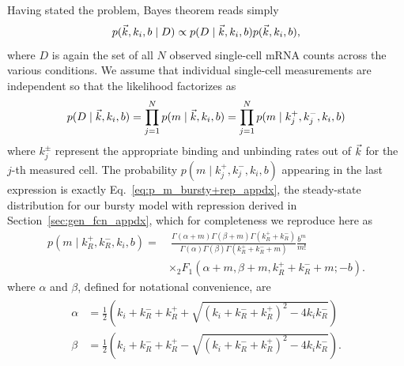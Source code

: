 Having stated the problem, Bayes theorem reads simply
\begin{equation}
p(\vec{k}, k_i, b \mid D)
\propto
p(D \mid\vec{k}, k_i, b) p(\vec{k}, k_i, b),
\end{equation}
where $D$ is again the set of all $N$ observed single-cell mRNA counts
across the various conditions. We assume that individual single-cell
measurements are independent so that the likelihood factorizes as
\begin{equation}
p(D \mid\vec{k}, k_i, b)
= \prod_{j=1}^N p(m\mid \vec{k}, k_i, b)
= \prod_{j=1}^N p(m\mid k_j^+, k_j^-, k_i, b)
\end{equation}
where $k_j^\pm$ represent the appropriate binding and unbinding
rates out of $\vec{k}$ for the $j$-th measured cell. The probability
$p(m\mid k_j^+, k_j^-, k_i, b)$ appearing in the last expression
is exactly Eq.~\ref{eq:p_m_bursty+rep_appdx}, the steady-state
distribution for our bursty model with repression derived in
Section~\ref{sec:gen_fcn_appdx}, which for completeness we reproduce here as
\begin{equation}
\begin{split}
p(m \mid k_R^+, k_R^-, k_i, b) = & ~\frac{
        \Gamma(\alpha + m)\Gamma(\beta + m)\Gamma(k_R^+ + k_R^-)
        }
        {
        \Gamma(\alpha)\Gamma(\beta)\Gamma(k_R^+ + k_R^- + m)
        }
\frac{b^m}{m!}
\\
&\times {_2F_1}(\alpha+m, \beta+m, k_R^++k_R^-+m; -b).
\end{split}
\label{eq:p_m_bursty+rep}
\end{equation}
where $\alpha$ and $\beta$, defined for notational convenience, are
\begin{align}
\begin{split}
\alpha &= \frac{1}{2}
\left(k_i+k_R^-+k_R^+ + \sqrt{(k_i+k_R^-+k_R^+)^2 - 4k_i k_R^-}\right)
\\
\beta &= \frac{1}{2}
\left(k_i+k_R^-+k_R^+ - \sqrt{(k_i+k_R^-+k_R^+)^2 - 4k_i k_R^-}\right).
\end{split}
\end{align}


